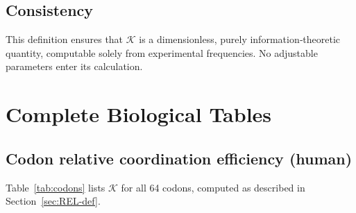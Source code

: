 \documentclass[12pt,a4paper]{article}
\newcommand{\REL}{\mathcal{K}}          %
\begin{document}
	\subsection{Consistency}
	This definition ensures that \(\REL\) is a dimensionless, purely information‑theoretic quantity, computable solely from experimental frequencies. No adjustable parameters enter its calculation.
	
	\section{Complete Biological Tables}
	\label{sec:tables}
	
	\subsection{Codon relative coordination efficiency (human)}
	\label{sec:codons}
	Table~\ref{tab:codons} lists \(\REL\) for all 64 codons, computed as described in Section~\ref{sec:REL-def}.
	
\end{document}
